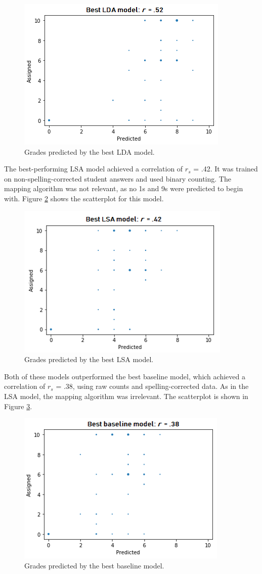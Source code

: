 \documentclass[a4paper,10pt,twoside]{article}
\begin{document}
\begin{figure}[h]
\centering
\includegraphics[width=0.5\linewidth]{"Best LDA model"}
\caption{Grades predicted by the best LDA model.}
\label{lda}
\end{figure}

The best-performing LSA model achieved a correlation of $\textit{r}_s$ = .42. It was trained on non-spelling-corrected student answers and used binary counting. The mapping algorithm was not relevant, as no 1s and 9s were predicted to begin with. Figure \ref{lsa} shows the scatterplot for this model.

\begin{figure}[h]
\centering
\includegraphics[width=0.5\linewidth]{"Best LSA model"}
\caption{Grades predicted by the best LSA model.}
\label{lsa}
\end{figure}

Both of these models outperformed the best baseline model, which achieved a correlation of $\textit{r}_s$ = .38, using raw counts and spelling-corrected data. As in the LSA model, the mapping algorithm was irrelevant. The scatterplot is shown in Figure \ref{baseline}.

\begin{figure}[h]
\centering
\includegraphics[width=0.5\linewidth]{"Best baseline model"}
\caption{Grades predicted by the best baseline model.}
\label{baseline}
\end{figure}
\end{document}
